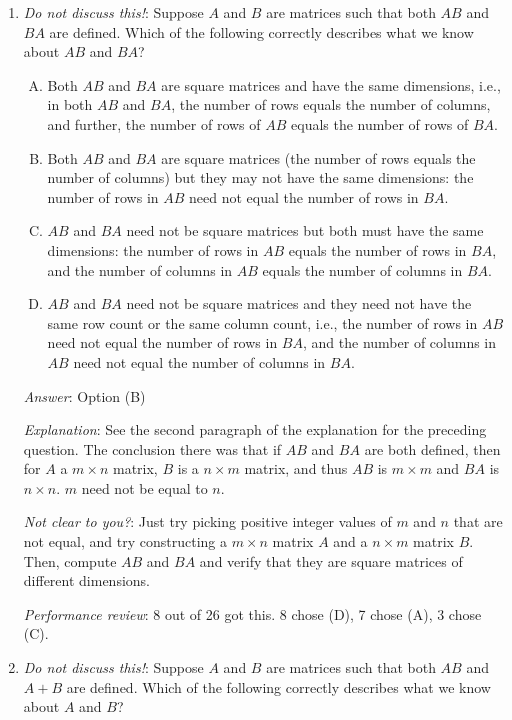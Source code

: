 \documentclass[10pt]{amsart}
\begin{document}
\begin{enumerate}
\item {\em Do not discuss this!}: Suppose $A$ and $B$ are matrices
  such that both $AB$ and $BA$ are defined. Which of the following
  correctly describes what we know about $AB$ and $BA$?

  \begin{enumerate}[(A)]
  \item Both $AB$ and $BA$ are square matrices and have the same
    dimensions, i.e., in both $AB$ and $BA$, the number of rows equals
    the number of columns, and further, the number of rows of $AB$
    equals the number of rows of $BA$.
  \item Both $AB$ and $BA$ are square matrices (the number of rows
    equals the number of columns) but they may not have the same
    dimensions: the number of rows in $AB$ need not equal the number of
    rows in $BA$.
  \item $AB$ and $BA$ need not be square matrices but both must have
    the same dimensions: the number of rows in $AB$ equals the number
    of rows in $BA$, and the number of columns in $AB$ equals the
    number of columns in $BA$.
  \item $AB$ and $BA$ need not be square matrices and they need not
    have the same row count or the same column count, i.e., the number
    of rows in $AB$ need not equal the number of rows in $BA$, and the
    number of columns in $AB$ need not equal the number of columns in
    $BA$.
  \end{enumerate}

  {\em Answer}: Option (B)

  {\em Explanation}: See the second paragraph of the explanation for
  the preceding question. The conclusion there was that if $AB$ and
  $BA$ are both defined, then for $A$ a $m \times n$ matrix, $B$ is a
  $n \times m$ matrix, and thus $AB$ is $m \times m$ and $BA$ is $n
  \times n$. $m$ need not be equal to $n$.

  {\em Not clear to you?}: Just try picking positive integer values of
  $m$ and $n$ that are not equal, and try constructing a $m \times n$
  matrix $A$ and a $n \times m$ matrix $B$. Then, compute $AB$ and
  $BA$ and verify that they are square matrices of different
  dimensions.

  {\em Performance review}: 8 out of 26 got this. 8 chose (D), 7 chose
  (A), 3 chose (C).

\item {\em Do not discuss this!}: Suppose $A$ and $B$ are matrices
  such that both $AB$ and $A + B$ are defined. Which of the following
  correctly describes what we know about $A$ and $B$?


\end{enumerate}
\end{document}
